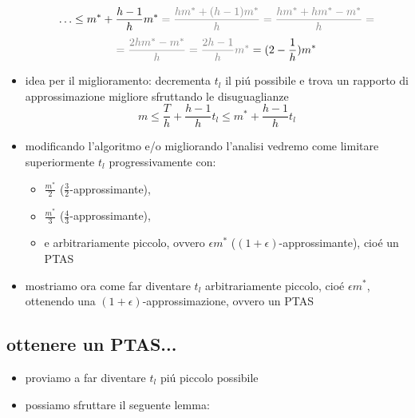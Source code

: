 \begin{flushleft}
\begin{itemize}
			$$\ldots\leq m^*+\frac{h-1}{h}m^*\color{gray}=\frac{hm^*+(h-1)m^*}{h}=\frac{hm^*+hm^*-m^*}{h}=$$
			$$\color{gray}=\frac{2hm^*-m^*}{h}=\frac{2h-1}{h}m^*\color{black}=(2-\frac{1}{h})m^*$$
		\item idea per il miglioramento: decrementa $t_l$ il pi\'u possibile e trova un rapporto di approssimazione migliore sfruttando le disuguaglianze
			$$m\leq\frac{T}{h}+\frac{h-1}{h}t_l\leq m^*+\frac{h-1}{h}t_l$$
		\item modificando l'algoritmo e/o migliorando l'analisi vedremo come limitare superiormente $t_l$ progressivamente con:
		\begin{itemize}
			\item $\frac{m^*}{2}$ ($\frac{3}{2}$-approssimante),
			\item $\frac{m^*}{3}$ ($\frac{4}{3}$-approssimante),
			\item e arbitrariamente piccolo, ovvero $\epsilon m^*$ ($(1+\epsilon)$-approssimante), cio\'e un PTAS 
		\end{itemize}
	\item mostriamo ora come far diventare $t_l$ arbitrariamente piccolo, cio\'e $\epsilon m^*$, ottenendo una $(1+\epsilon)$-approssimazione, ovvero un PTAS
	\end{itemize}
\end{flushleft}


\subsection*{ottenere un PTAS...}
\begin{flushleft}
	\begin{itemize}
		\item proviamo a far diventare $t_l$ pi\'u piccolo possibile
		\item possiamo sfruttare il seguente lemma:
	\end{itemize}
\end{flushleft}


